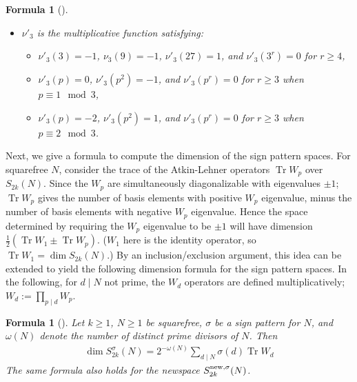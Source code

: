 \documentclass[12pt,letterpaper,reqno]{amsart}
\newtheorem{formula}[theorem]{Formula}
\theoremstyle{definition}
\numberwithin{equation}{section}
\numberwithin{figure}{section}
\numberwithin{table}{section}
\newcommand{\lrp}[1]{\left(#1\right)}
\DeclareMathOperator{\Tr}{Tr}
\newcommand{\nw}{{\textnormal{new}}}
\begin{document}
\begin{formula}[{\cite[Theorem 1]{martin}}]
\begin{itemize}
\begin{itemize}
            \item $\nu'_2(p)=-2$, $\nu'_2(p^2) = 1$, and $\nu'_2(p^r)=0$ for $r \ge 3$ when $p \equiv 3 \mod 4$;
        \end{itemize}
        \item $\nu'_3$ is the multiplicative function satisfying:
        \begin{itemize}
            \item $\nu'_3(3) = -1$, $\nu_3(9) = -1$, $\nu'_3(27)=1$, and $\nu'_3(3^r) = 0$ for $r \ge 4$,
            \item $\nu'_3(p)=0$, $\nu'_3(p^2) = -1$, and $\nu'_3(p^r)=0$ for $r \ge 3$ when $p \equiv 1 \mod 3$,
            \item $\nu'_3(p)=-2$, $\nu'_3(p^2) = 1$, and $\nu'_3(p^r)=0$ for $r \ge 3$ when $p \equiv 2 \mod 3$.
        \end{itemize}
    \end{itemize}
\end{formula}

Next, we give a formula to compute the dimension of the sign pattern spaces. 
For squarefree $N$, consider the trace of the Atkin-Lehner operators $\Tr W_p$ over $S_{2k}(N)$. Since the $W_p$ are simultaneously diagonalizable with eigenvalues $\pm 1$; $\Tr W_p$ gives the number of basis elements with positive $W_p$ eigenvalue, minus the number of basis elements with negative $W_p$ eigenvalue. Hence the space determined by requiring the $W_p$ eigenvalue to be $\pm1$ will have dimension $\frac12 \lrp{\Tr W_1 \pm \Tr W_p}$. ($W_1$ here is the identity operator, so $\Tr W_1 = \dim S_{2k}(N)$.) By an inclusion/exclusion argument, this idea can be extended to yield the following dimension formula for the sign pattern spaces. In the following, for $d \mid N$ not prime, the $W_d$ operators are defined multiplicatively; $W_d := \prod_{p \mid d} W_p$.
\begin{formula}[{\cite[Proposition 3.2]{kimball}}] \label{form:dim-sgnpatt-convolution}
    Let $k \ge 1$, $N \ge 1$ be squarefree, $\sigma$ be a sign pattern for $N$, and $\omega(N)$ denote the number of distinct prime divisors of $N$. Then
    \begin{align}
        \dim S_{2k}^\sigma(N) = 2^{- \omega(N)}\sum_{d \mid N} \sigma(d) \Tr W_d
    \end{align}
    The same formula also holds for the newspace $S_{2k}^{\nw,\sigma}(N)$.
\end{formula}
\end{document}

